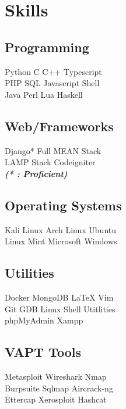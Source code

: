 \documentclass[]{deedy-resume-openfont}
\begin{document}
\begin{minipage}[t]{0.30\textwidth}
\section{Skills}
\subsection{Programming}
Python \textbullet{} C \textbullet{} C++ \textbullet{} Typescript \\
PHP \textbullet{} SQL \textbullet{} Javascript \textbullet{}  Shell \\
 \vspace{0.1 cm}
 Java \textbullet{} Perl \textbullet{} Lua \textbullet{} Haskell \\
\vspace{0.4 cm} 
\subsection{Web/Frameworks}
Django* \textbullet{} Full MEAN Stack \\
LAMP Stack \textbullet{} Codeigniter \\
{\footnotesize \textit{\textbf{ (* : Proficient)}}}
\vspace{0.4 cm}
\subsection{Operating Systems}
Kali Linux \textbullet{} Arch Linux \textbullet{} Ubuntu \\
Linux Mint \textbullet{} Microsoft Windows
\vspace{0.4 cm}
\subsection{Utilities}
Docker \textbullet{} MongoDB \textbullet{} \LaTeX{} \textbullet{} Vim \\
Git \textbullet{} GDB \textbullet{} Linux Shell Utitlities \\
phpMyAdmin \textbullet{} Xampp
\vspace{0.4 cm}
\subsection{VAPT Tools}
Metasploit \textbullet{} Wireshark \textbullet{} Nmap \\
Burpsuite \textbullet{} Sqlmap \textbullet{} Aircrack-ng \\
Ettercap \textbullet{} Xerosploit \textbullet{} Hashcat


\end{minipage}
\end{document}
